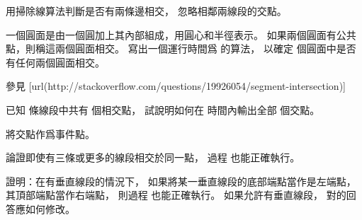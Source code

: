 \startANSWER
用掃除線算法判斷是否有兩條邊相交，
忽略相鄰兩線段的交點。
\stopANSWER

\startEXERCISE
一個圓面是由一個圓加上其內部組成，用圓心和半徑表示。
如果兩個圓面有公共點，則稱這兩個圓面相交。
寫出一個運行時間爲  的算法，
以確定  個圓面中是否有任何兩個圓面相交。
\stopEXERCISE

\startANSWER
參見
[url(http://stackoverflow.com/questions/19926054/segment-intersection)]

\stopANSWER

\startEXERCISE
已知  條線段中共有  個相交點，
試說明如何在  時間內輸出全部  個交點。
\stopEXERCISE

\startANSWER
將交點作爲事件點。
\stopANSWER

\startEXERCISE
論證即使有三條或更多的線段相交於同一點，
過程  也能正確執行。
\stopEXERCISE

\startANSWER
{}
\stopANSWER

\startEXERCISE
證明：在有垂直線段的情況下，
如果將某一垂直線段的底部端點當作是左端點，
其頂部端點當作右端點，
則過程  也能正確執行。
如果允許有垂直線段，
對\inexercise[33.2-2] 的回答應如何修改。
\stopEXERCISE

\startANSWER
{}
\stopANSWER

\stopsection
